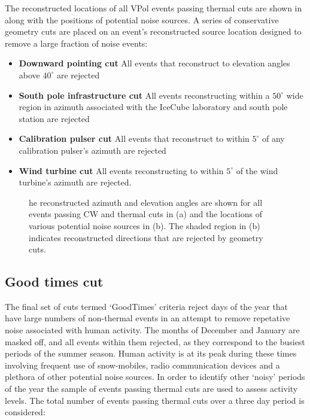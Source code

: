 The reconstructed locations of all VPol events passing thermal cuts are shown in  along with the positions of potential noise sources. A series of conservative geometry cuts are placed on an event's reconstructed source location designed to remove a large fraction of noise events:

\begin{itemize}

\item \textbf{Downward pointing cut} All events that reconstruct to elevation angles above $40^\circ$ are rejected

\item \textbf{South pole infrastructure cut} All events reconstructing within a $50^\circ$ wide region in azimuth associated with the IceCube laboratory and south pole station are rejected

\item \textbf{Calibration pulser cut} All events that reconstruct to within $5^\circ$ of any calibration pulser's azimuth are rejected

\item \textbf{Wind turbine cut} All events reconstructing to within $5^\circ$ of the wind turbine's azimuth are rejected.

\end{itemize}

\begin{figure}[htpb]
  \hfill
  \caption{he reconstructed azimuth and elevation angles are shown for all events passing CW and thermal cuts in (a) and the locations of various potential noise sources in (b). The shaded region in (b) indicates reconstructed directions that are rejected by geometry cuts.}
  \label{fig:Analysis:Anthroprogenic-Cuts:Geometry-Cuts:VPol-Reco}
\end{figure}

\subsection{Good times cut}
\label{sec:Analysis:Anthroprogenic-Cuts:Good-Times}
The final set of cuts termed `GoodTimes' criteria reject days of the year that have large numbers of non-thermal events in an attempt to remove repetative noise associated with human activity. The months of December and January are masked off, and all events within them rejected, as they correspond to the busiest periods of the summer season. Human activity is at its peak during these times involving frequent use of snow-mobiles, radio communication devices and a plethora of other potential noise sources. In order to identify other `noisy' periods of the year the sample of events passing thermal cuts are used to assess activity levels. The total number of events passing thermal cuts over a three day period is considered:

